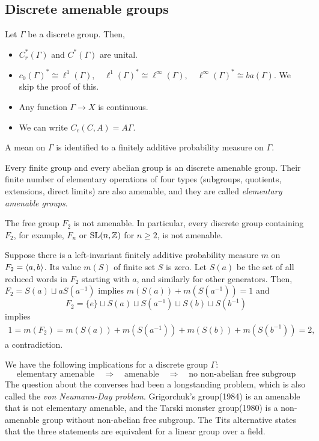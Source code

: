 \documentclass{../../../small}
\begin{document}
\subsection{Discrete amenable groups}


Let $\Gamma$ be a discrete group.
Then,
\begin{itemize}
\item $C_r^*(\Gamma)$ and $C^*(\Gamma)$ are unital.
\item $c_0(\Gamma)^*\cong\ell^1(\Gamma),
\quad\ell^1(\Gamma)^*\cong\ell^\infty(\Gamma),
\quad\ell^\infty(\Gamma)^*\cong ba(\Gamma)$.
We skip the proof of this.
\item Any function $\Gamma\to X$ is continuous.
\item We can write $C_c(C, A)= A\Gamma$.
\end{itemize}
A mean on $\Gamma$ is identified to a finitely additive probability measure on $\Gamma$.

\begin{ex}
\end{ex}

\begin{ex}
Every finite group and every abelian group is an discrete amenable group.
Their finite number of elementary operations of four types (subgroups, quotients, extensions, direct limits) are also amenable, and they are called \emph{elementary amenable groups}.
\end{ex}

\begin{ex}
The free group $F_2$ is not amenable.
In particular, every discrete group containing $F_2$, for example, $F_n$ or $\mathrm{SL}(n,\mathbb{Z})$ for $n\ge2$, is not amenable.
\end{ex}
\begin{pf}
Suppose there is a left-invariant finitely additive probability measure $m$ on $F_2=\langle a,b\rangle$.
Its value $m(S)$ of finite set $S$ is zero.
Let $S(a)$ be the set of all reduced words in $F_2$ starting with $a$, and similarly for other generators.
Then, $F_2=S(a)\sqcup aS(a^{-1})$ implies $m(S(a))+m(S(a^{-1}))=1$ and
\[F_2=\{e\}\sqcup S(a)\sqcup S(a^{-1})\sqcup S(b)\sqcup S(b^{-1})\]
implies
\begin{align*}
1=m(F_2)=m(S(a))+m(S(a^{-1}))+m(S(b))+m(S(b^{-1}))=2,
\end{align*}
a contradiction.
\end{pf}

\begin{rmk}
We have the following implications for a discrete group $\Gamma$:
\[\text{elementary amenable}\quad\Longrightarrow\quad\text{amenable}\quad\Longrightarrow\quad\text{no non-abelian free subgroup}\]
The question about the converses had been a longstanding problem, which is also called the \emph{von Neumann-Day problem}.
Grigorchuk's group(1984) is an amenable that is not elementary amenable, and the Tarski monster group(1980) is a non-amenable group without non-abelian free subgroup.
The Tits alternative states that the three statements are equivalent for a linear group over a field.
\end{rmk}
\end{document}
